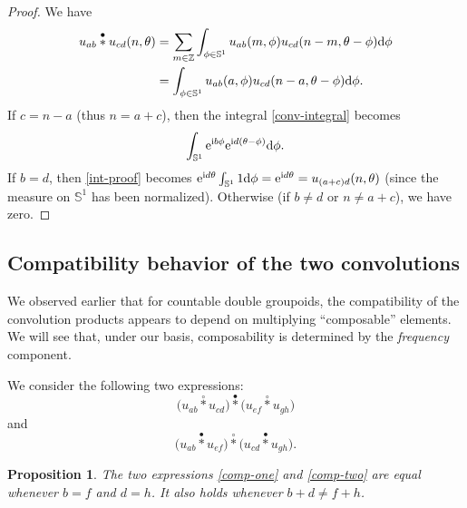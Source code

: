 \documentclass[10pt,a4paper]{amsart}
\numberwithin{equation}{section}
\newtheorem{Proposition}[Theorem]{Proposition}
\theoremstyle{definition}
\newcommand{\BBZ}{\mathbb{Z}}
\newcommand{\BBS}{\mathbb{S}}
\newcommand{\stardot}{\overset{{\bullet}}{*}}
\newcommand{\starcirc}{\overset{\circ}{*}}
\begin{document}
\begin{proof}
We have
\begin{align}
  \notag u_{ab}\stardot u_{cd}(n,\theta) & = \sum_{m\in\BBZ} \int_{\phi\in \BBS^1} u_{ab}(m,\phi)u_{cd}(n-m,\theta-\phi){\rm d}\phi\\
  & \label{conv-integral} = \int_{\phi\in\BBS^1} u_{ab}(a,\phi)u_{cd}(n-a,\theta-\phi){\rm d}\phi.
\end{align}
If $c=n-a$ (thus $n=a+c$), then the integral \eqref{conv-integral} becomes
\begin{equation}\label{int-proof}
 \int_{\BBS^1} {\rm e}^{{\rm i} b\phi}{\rm e}^{{\rm i} d(\theta-\phi)}{\rm d}\phi.
 \end{equation}
 If $b=d$, then \eqref{int-proof} becomes
$ {\rm e}^{{\rm i} d\theta} \int_{\BBS^1} 1 {\rm d}\phi
= {\rm e}^{{\rm i} d\theta}
= u_{(a+c)d}(n,\theta)
$
(since the measure on $\BBS^1$ has been normalized). Otherwise (if $b\neq d$ or $n\neq a+c$), we have zero.
\end{proof}

\subsection{Compatibility behavior of the two convolutions}
We observed earlier that for countable double groupoids, the compatibility of the convolution products appears to depend on multiplying ``composable'' elements. We will see that, under our basis, composability is determined by the \emph{frequency} component.

We consider the following two expressions:
\begin{equation}\label{comp-one}
\big(u_{ab}\starcirc u_{cd}\big)\stardot\big(u_{ef}\starcirc u_{gh}\big)
\end{equation}
and
\begin{equation}\label{comp-two}
\big(u_{ab}\stardot u_{ef}\big)\starcirc\big(u_{cd}\stardot u_{gh}\big).
\end{equation}

\begin{Proposition} The two expressions \eqref{comp-one} and \eqref{comp-two} are equal whenever $b=f$ and $d=h$. It also holds whenever $b+d\neq f+h$.
\end{Proposition}
\end{document}
